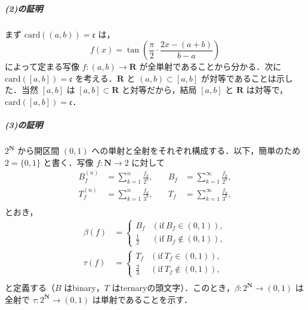 \documentclass[10pt,b5paper,pandoc]{bxjsarticle}
\let\oldsubparagraph\subparagraph
\renewcommand{\subparagraph}[1]{\oldsubparagraph{#1}\mbox{}}
\begin{document}
\hypertarget{ux306eux8a3cux660e-1}{%
\subparagraph{(2)の証明}\label{ux306eux8a3cux660e-1}}

まず \(\mathrm{card}((a, b)) = \mathfrak c\) は， \[
f(x) = \tan\left( \frac \pi2 \cdot \frac{2x - (a + b)}{b - a} \right)
\] によって定まる写像 \(f \colon (a, b) \to \boldsymbol R\)
が全単射であることから分かる．次に
\(\mathrm{card}([a, b]) = \mathfrak c\) を考える．\(\boldsymbol R\) と
\((a, b) \subset [a, b]\) が対等であることは示した．当然 \([a, b]\) は
\([a, b] \subset \boldsymbol R\) と対等だから，結局 \([a, b]\) と
\(\boldsymbol R\) は対等で，\(\mathrm{card}([a, b]) = \mathfrak c\)．

\hypertarget{ux306eux8a3cux660e-2}{%
\subparagraph{(3)の証明}\label{ux306eux8a3cux660e-2}}

\(2^{\boldsymbol N}\) から開区間 \((0, 1)\)
への単射と全射をそれぞれ構成する．以下，簡単のため \(2 = \{ 0, 1 \}\)
と書く．写像 \(f \colon \boldsymbol N \to 2\) に対して \begin{align*}
B_f^{(n)} &= \sum_{k = 1}^n \frac{f_k}{2^k},&\quad B_f &= \sum_{k = 1}^\infty \frac{f_k}{2^k},\\
T_f^{(n)} &= \sum_{k = 1}^n \frac{f_k}{3^k},&\quad T_f &= \sum_{k = 1}^\infty \frac{f_k}{3^k},\\
\end{align*} とおき， \begin{align*}
\beta(f) &= \left\{ \begin{array}{ll} B_f & (\text{if}\ B_f \in (0, 1)),\\ \frac 12 & (\text{if}\ B_f \notin (0, 1)), \end{array} \right. \\
\tau(f) &= \left\{ \begin{array}{ll} T_f & (\text{if}\ T_f \in (0, 1)),\\ \frac 23 & (\text{if}\ T_f \notin (0, 1)), \end{array} \right. \\
\end{align*} と定義する（\(B\) はbinary，\(T\)
はternaryの頭文字）．このとき，\(\beta \colon 2^{\boldsymbol N} \to (0, 1)\)
は全射で \(\tau \colon 2^{\boldsymbol N} \to (0, 1)\)
は単射であることを示す．
\end{document}
